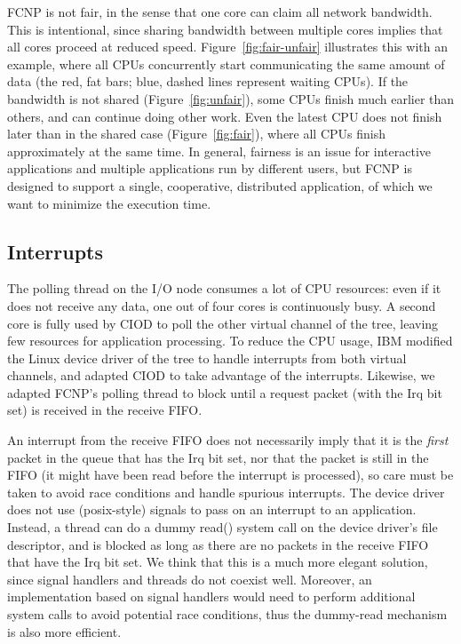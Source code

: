 \documentclass[conference]{worldcomp}
\begin{document}
FCNP is not fair, in the sense that one core can claim all network bandwidth.
This is intentional, since sharing bandwidth between multiple cores implies
that all cores proceed at reduced speed.
Figure~\ref{fig:fair-unfair} illustrates this with an example, where all
CPUs concurrently start communicating the same amount of data (the red, fat
bars; blue, dashed lines represent waiting CPUs).
If the bandwidth is not shared (Figure~\ref{fig:unfair}), some CPUs finish
much earlier than others, and can continue doing other work.
Even the latest CPU does not finish later than in the shared case
(Figure~\ref{fig:fair}), where all CPUs finish approximately at the same time.
In general, fairness is an issue for interactive applications and multiple
applications run by different users, but FCNP is designed to support a single,
cooperative, distributed application, of which we want to minimize the
execution time.


\subsection{Interrupts}
\label{sec:interrupts}

The polling thread on the I/O node consumes a lot of CPU resources: even if it
does not receive any data, one out of four cores is continuously busy.
A second core is fully used by CIOD to poll the other virtual channel of the
tree, leaving few resources for application processing.
To reduce the CPU usage, IBM modified the Linux device driver of the tree to
handle interrupts from both virtual channels, and adapted CIOD to take
advantage of the interrupts.
Likewise, we adapted FCNP's polling thread to block until a request packet
(with the Irq bit set) is received in the receive FIFO.

An interrupt from the receive FIFO does not necessarily imply that it is the
\emph{first\/} packet in the queue that has the Irq bit set, nor that the
packet is still in the FIFO (it might have been read before the interrupt is
processed), so care must be taken to avoid race conditions and handle spurious
interrupts.
The device driver does not use (posix-style) signals to pass on an interrupt
to an application.
Instead, a thread can do a dummy read() system call on the device driver's
file descriptor, and is blocked as long as there are no packets in the
receive FIFO that have the Irq bit set.
We think that this is a much more elegant solution, since signal handlers and
threads do not coexist well.
Moreover, an implementation based on signal handlers would need to perform
additional system calls to avoid potential race conditions, thus the dummy-read
mechanism is also more efficient.
\end{document}
